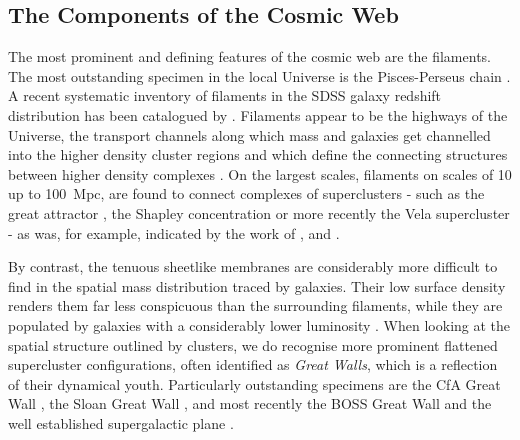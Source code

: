 \documentclass[useAMS,usenatbib]{mnras}
\begin{document}
\subsection{The Components of the Cosmic Web}
The most prominent and defining features of the cosmic web are the filaments. The most outstanding specimen in the local Universe 
is the Pisces-Perseus chain \citep{giovanelli1985}. A recent systematic inventory of filaments in the SDSS galaxy redshift 
distribution has been catalogued by \cite{tempel2014} \cite[also see][]{jones2010,sousbie2011b}. Filaments appear to be the highways of the Universe, 
the transport channels along which mass and galaxies get channelled into the higher density cluster regions \citep{haarlemwey1993,2004ApJ...603....7K} and 
which define the connecting structures between higher density complexes \citep{bondweb1996,colberg2005,weybond2008,aragon2010}. On the largest 
scales, filaments on scales of 10 up to 100~Mpc, are found to connect complexes of superclusters - such as the great attractor 
\citep{1988ApJ...326...19L}, the Shapley concentration 
\citep{1930BHarO.874....9S,2006A&A...447..133P} or more recently the Vela supercluster \citep{2017MNRAS.466L..29K} - as was, for example, indicated by the work of \cite{2004ApJ...606...25B}, \cite{romanodiaz2007} and \cite{2015MNRAS.452.1052L}. 

By contrast, the tenuous sheetlike membranes are considerably more difficult to find in the spatial mass distribution traced by 
galaxies. Their low surface density renders them far less conspicuous than the surrounding filaments, while they are populated 
by galaxies with a considerably lower luminosity \citep[see e.g.][]{cautun2014}. When looking at the spatial structure outlined by 
clusters, we do recognise more prominent flattened supercluster configurations, often identified as \emph{Great Walls}, which 
is a reflection of their dynamical youth. Particularly outstanding specimens are the 
CfA Great Wall \citep{geller1989}, the Sloan Great Wall \citep{2005ApJ...624..463G}, and most recently the BOSS 
Great Wall \citep{2016A&A...588L...4L} and the well established supergalactic plane \citep{1953AJ.....58...30D,2000MNRAS.312..166L}. 
\end{document}
